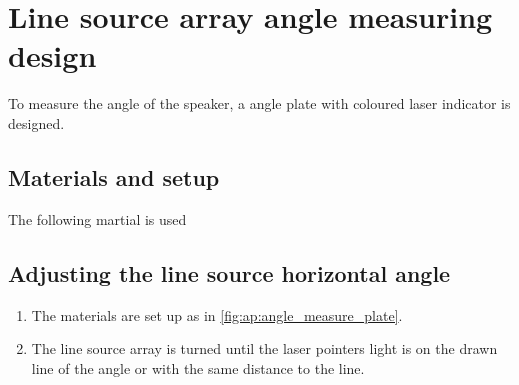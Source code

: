 \chapter{Line source array angle measuring design}
To measure the angle of the speaker, a angle plate with coloured laser indicator is designed. 


\section*{Materials and setup}
The following martial is used

\startequipment
{}
\stopequipment


\section*{Adjusting the line source horizontal angle}


\begin{enumerate}
\item The materials are set up as in \autoref{fig:ap:angle_measure_plate}.
\item The line source array is turned until the laser pointers light is on the drawn line of the angle or with the same distance to the line.
\end{enumerate}





